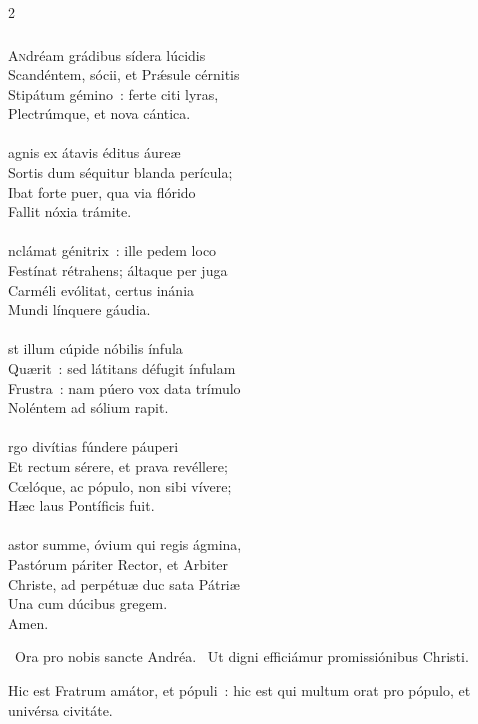 \documentclass[9pt,twoside]{extarticle}
\begin{document}
\begin{multicols}{2}
{\subsubsection*{\center {}}
\lettrine{A}ndréam grádibus sídera lúcidis\\
Scandéntem, sócii, et Prǽsule cérnitis\\
Stipátum gémino~: ferte citi lyras,\\
Plectrúmque, et nova cántica.\\
\\
agnis ex átavis éditus áureæ\\
Sortis dum séquitur blanda perícula;\\
Ibat forte puer, qua via flórido\\
Fallit nóxia trámite.\\
\\
nclámat génitrix~: ille pedem loco\\
Festínat rétrahens; áltaque per juga\\
Carméli evólitat, certus inánia\\
Mundi línquere gáudia.\\
\\
st illum cúpide nóbilis ínfula\\
Quærit~: sed látitans défugit ínfulam\\
Frustra~: nam púero vox data trímulo\\
Noléntem ad sólium rapit.\\
\\
rgo divítias fúndere páuperi\\
Et rectum sérere, et prava revéllere;\\
Cœlóque, ac pópulo, non sibi vívere;\\
Hæc laus Pontíficis fuit.\\
\\
astor summe, óvium qui regis ágmina,\\
Pastórum páriter Rector, et Arbiter\\
Christe, ad perpétuæ duc sata Pátriæ\\
Una cum dúcibus gregem.\\
Amen.

\begin{tightlist}{}
\item {}~Ora pro nobis sancte Andréa. ~Ut digni efficiámur promissiónibus Christi.
\item {} Hic est Fratrum amátor, et pópuli~: hic est qui multum orat pro pópulo, et univérsa civitáte.
\end{tightlist}

}
\end{multicols}
\end{document}
